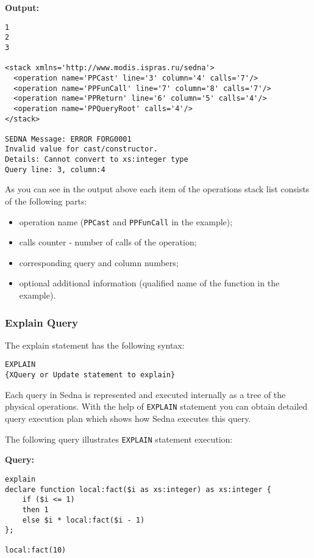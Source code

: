 \documentclass[a4paper,12pt]{article}
\begin{document}
\medskip
\noindent
\textbf{Output:}

\small{
\begin{verbatim}
1
2
3

<stack xmlns='http://www.modis.ispras.ru/sedna'>
  <operation name='PPCast' line='3' column='4' calls='7'/>
  <operation name='PPFunCall' line='7' column='8' calls='7'/>
  <operation name='PPReturn' line='6' column='5' calls='4'/>
  <operation name='PPQueryRoot' calls='4'/>
</stack>

SEDNA Message: ERROR FORG0001
Invalid value for cast/constructor.
Details: Cannot convert to xs:integer type
Query line: 3, column:4
\end{verbatim}}

As you can see in the output above each item of the operations stack list
consists of the following parts:

\begin{itemize}
\item operation name (\verb!PPCast! and \verb!PPFunCall! in the example);
\item calls counter - number of calls of the operation;
\item corresponding query and column numbers;
\item optional additional information (qualified name of the function in the
example).
\end{itemize}


\subsubsection{Explain Query}
\label{explain}

The explain statement has the following syntax:
\begin{verbatim}
EXPLAIN
{XQuery or Update statement to explain}
\end{verbatim}
Each query in Sedna is represented and executed internally as a tree of the
physical operations. With the help of \verb!EXPLAIN! statement you can obtain
detailed query execution plan which shows how Sedna executes this query.

\medskip
\noindent
The following query illustrates \verb!EXPLAIN! statement execution:

\medskip
\noindent
\textbf{Query:}
\begin{verbatim}
explain
declare function local:fact($i as xs:integer) as xs:integer {
    if ($i <= 1)
    then 1
    else $i * local:fact($i - 1)
};

local:fact(10)
\end{verbatim}
\end{document}
